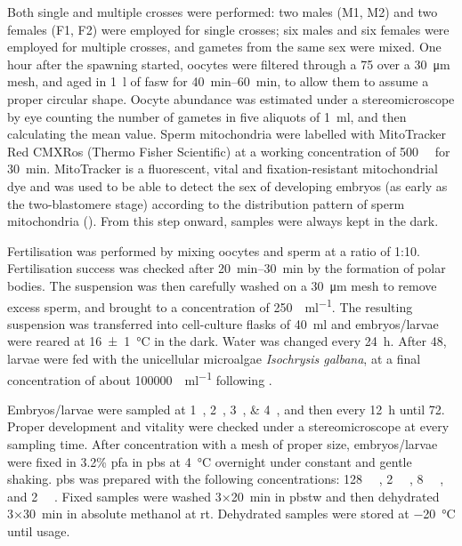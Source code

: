 Both single and multiple crosses were performed: two males (M1, M2) and two females (F1, F2) were employed for single crosses; six males and six females were employed for multiple crosses, and gametes from the same sex were mixed. One hour after the spawning started, oocytes were filtered through a \num{75} over a \qty{30}{\um} mesh, and aged in \qty{1}{\l} of \gls{fasw} for \qtyrange{40}{60}{\minute}, to allow them to assume a proper circular shape. Oocyte abundance was estimated under a stereomicroscope by eye counting the number of gametes in five aliquots of \qty{1}{\ml}, and then calculating the mean value. Sperm mitochondria were labelled with MitoTracker Red CMXRos (Thermo Fisher Scientific) at a working concentration of \qty{500}{\nano\molar} for \qty{30}{\minute}. MitoTracker is a fluorescent, vital and fixation-resistant mitochondrial dye and was used to be able to detect the sex of developing embryos (as early as the two-blastomere stage) according to the distribution pattern of sperm mitochondria (). From this step onward, samples were always kept in the dark.

Fertilisation was performed by mixing oocytes and sperm at a ratio of 1:10. Fertilisation success was checked after \qtyrange{20}{30}{\minute} by the formation of polar bodies. The suspension was then carefully washed on a \qty{30}{\um} mesh to remove excess sperm, and brought to a concentration of \qty{250}{\zygotes\per\ml}. The resulting suspension was transferred into cell-culture flasks of \qty{40}{\ml} and embryos/larvae were reared at \qty{16(1)}{\degreeCelsius} in the dark. Water was changed every \qty{24}{\hour}. After \qty{48}{\hpf}, larvae were fed with the unicellular microalgae \textit{Isochrysis galbana}, at a final concentration of about \qty{100000}{\cells\per\ml} following .

Embryos/larvae were sampled at \qtylist{1;2;3;4}{\hpf}, and then every \qty{12}{\hour} until \qty{72}{\hpf}. Proper development and vitality were checked under a stereomicroscope at every sampling time. After concentration with a mesh of proper size, embryos/larvae were fixed in 3.2\% \gls{pfa} in \gls{pbs} at \qty{4}{\degreeCelsius} overnight under constant and gentle shaking. \gls{pbs} was prepared with the following concentrations: \qty{128}{\milli\molar} , \qty{2}{\milli\molar} , \qty{8}{\milli\molar} , and \qty{2}{\milli\molar} . Fixed samples were washed 3×\qty{20}{min} in \gls{pbstw} and then dehydrated 3×\qty{30}{\minute} in absolute methanol at \gls{rt}. Dehydrated samples were stored at \qty{-20}{\degreeCelsius} until usage.

